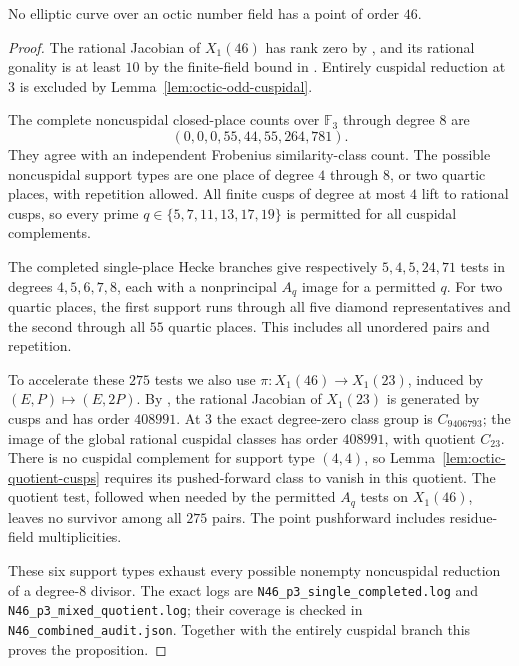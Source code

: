 \begin{proposition}\label{prop:octic46}
No elliptic curve over an octic number field has a point of order $46$.
\end{proposition}
\begin{proof}
The rational Jacobian of $X_1(46)$ has rank zero by
\cite[Theorem~3.1(2)]{DEHMZ}, and its rational gonality is at least
$10$ by the finite-field bound in \cite[Table~1]{NV}.
Entirely cuspidal reduction at $3$ is excluded by
Lemma~\ref{lem:octic-odd-cuspidal}.

The complete noncuspidal closed-place counts over $\mathbb F_3$
through degree $8$ are
\[
 (0,0,0,55,44,55,264,781).
\]
They agree with an independent Frobenius similarity-class count.
The possible noncuspidal support types are one place of degree $4$
through $8$, or two quartic places, with repetition allowed.
All finite cusps of degree at most $4$ lift to rational cusps, so
every prime $q\in\{5,7,11,13,17,19\}$ is permitted for all
cuspidal complements.

The completed single-place Hecke branches give respectively
$5,4,5,24,71$ tests in degrees $4,5,6,7,8$, each with a
nonprincipal $A_q$ image for a permitted $q$.
For two quartic places, the first support runs through all five
diamond representatives and the second through all $55$ quartic
places. This includes all unordered pairs and repetition.

To accelerate these $275$ tests we also use
$\pi:X_1(46)\longrightarrow X_1(23)$, induced by $(E,P)\mapsto(E,2P)$.
By \cite[Corollary~4.14 and Table~4]{DEHMZ}, the rational Jacobian of
$X_1(23)$ is generated by cusps and has order $408991$.
At $3$ the exact degree-zero class group is $C_{9406793}$;
the image of the global rational cuspidal classes has order
$408991$, with quotient $C_{23}$. There is no cuspidal complement
for support type $(4,4)$, so Lemma~\ref{lem:octic-quotient-cusps}
requires its pushed-forward class to vanish in this quotient.
The quotient test, followed when needed by the permitted $A_q$
tests on $X_1(46)$, leaves no survivor among all $275$ pairs.
The point pushforward includes residue-field multiplicities.

These six support types exhaust every possible nonempty
noncuspidal reduction of a degree-$8$ divisor. The exact logs are
\texttt{N46\_p3\_single\_completed.log} and
\texttt{N46\_p3\_mixed\_quotient.log}; their coverage is checked
in \texttt{N46\_combined\_audit.json}. Together with the
entirely cuspidal branch this proves the proposition.
\end{proof}
